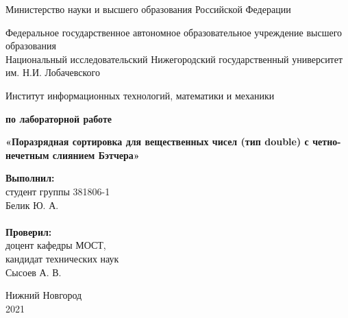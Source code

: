 \documentclass{report}
\begin{document}
	
	\begin{titlepage}
		
		\begin{center}
			Министерство науки и высшего образования Российской Федерации
		\end{center}
		
		\begin{center}
			Федеральное государственное автономное образовательное учреждение высшего образования \\
			Национальный исследовательский Нижегородский государственный университет им. Н.И. Лобачевского
		\end{center}
		
		\begin{center}
			Институт информационных технологий, математики и механики
		\end{center}
		
		\vspace{4em}
		
		\begin{center}
			\textbf{ по лабораторной работе} \\
		\end{center}
		\begin{center}
			\textbf{\Large«Поразрядная сортировка для вещественных чисел (тип double) с четно-нечетным слиянием Бэтчера»} \\
		\end{center}
		
		\vspace{4em}
		
		\newbox{\lbox}
		\newlength{\maxl}
		\setlength{\maxl}{\wd\lbox}
		\hfill\parbox{7cm}{
			\hspace*{5cm}\hspace*{-5cm}\textbf{Выполнил:} \\ студент группы 381806-1 \\ Белик Ю. А.\\
			\\
			\hspace*{5cm}\hspace*{-5cm}\textbf{Проверил:}\\ доцент кафедры МОСТ, \\ кандидат технических наук \\ Сысоев А. В.\\
		}
		\vspace{\fill}
		
		\begin{center} Нижний Новгород \\ 2021 \end{center}
		
	\end{titlepage}
	
\end{document}
